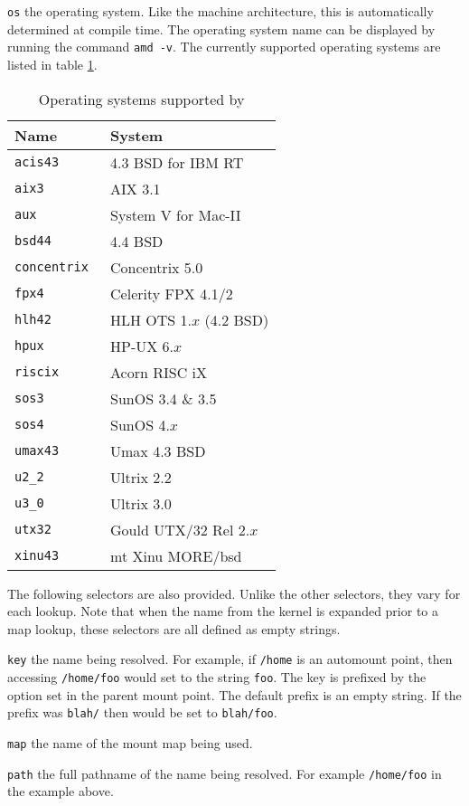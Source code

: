 \begin{list}{}
\item[\tt os\hfill]
the operating system.
Like the machine architecture, this is automatically determined at compile time.
The operating system name can be displayed by running the command {\tt amd~-v}.
The currently supported operating systems are listed in table \ref{table:os}.
\begin{table}[htb]
\centering
\begin{tabular}{ll}
Name		& System \\ \hline
\tt acis43	& 4.3 BSD for IBM RT \\
\tt aix3	& AIX 3.1 \\
\tt aux		& System V for Mac-II \\
\tt bsd44	& 4.4 BSD \\
\tt concentrix	& Concentrix 5.0 \\
\tt fpx4	& Celerity FPX 4.1/2 \\
\tt hlh42	& HLH OTS 1.$x$ (4.2 BSD) \\
\tt hpux	& HP-UX 6.$x$ \\
\tt riscix	& Acorn RISC iX \\
\tt sos3	& SunOS 3.4 \& 3.5 \\
\tt sos4	& SunOS 4.$x$ \\
\tt umax43	& Umax 4.3 BSD \\
\tt u2\_2	& Ultrix 2.2 \\
\tt u3\_0	& Ultrix 3.0 \\
\tt utx32	& Gould UTX/32 Rel 2.$x$ \\
\tt xinu43	& mt Xinu MORE/bsd \\
\end{tabular}
\caption{\label{table:os}Operating systems supported by \amd}
\end{table}
\end{list}

The following selectors are also provided.  Unlike the other selectors,
they vary for each lookup.
Note that when the name from the kernel is expanded prior to a map
lookup, these selectors are all defined as empty strings.
\begin{list}{}%
{\setlength{\leftmargin}{1.2\labelwidth}}
\item[\tt key\hfill]
the name being resolved.
For example, if {\tt /home} is an automount point, then accessing
{\tt /home/foo}\label{foo-path} would set  to the string {\tt foo}.
The key is prefixed by the  option set in the parent mount point.
The default prefix is an empty string.  If the prefix was {\tt blah/} then
 would be set to {\tt blah/foo}.

\item[\tt map\hfill]
the name of the mount map being used.

\item[\tt path\hfill]
the full pathname of the name being resolved.  For example {\tt /home/foo}
in the example above.

\end{list}

